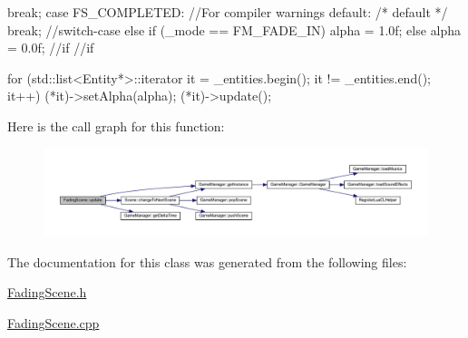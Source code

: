 \begin{DoxyCode}
{{{                                break;
                        case FS_COMPLETED:
                                //For compiler warnings
                        default:
                                /* default */
                                break;
                }//switch-case
        }
        else
        {
                if (_mode == FM_FADE_IN)
                {
                        alpha = 1.0f;
                } 
                else
                {
                        alpha = 0.0f;
                }//if
        }//if

        for (std::list<Entity*>::iterator it = _entities.begin(); it != 
      _entities.end(); it++)
        {
                (*it)->setAlpha(alpha);
                (*it)->update();
        }

}
\end{DoxyCode}


Here is the call graph for this function:
\nopagebreak
\begin{figure}[H]
\begin{center}
\leavevmode
\includegraphics[width=400pt]{d0/d30/class_fading_scene_a87df73975854a1170eef8b5fadd63b92_cgraph}
\end{center}
\end{figure}




The documentation for this class was generated from the following files:\begin{DoxyCompactItemize}
\item 
\hyperlink{_fading_scene_8h}{FadingScene.h}\item 
\hyperlink{_fading_scene_8cpp}{FadingScene.cpp}\end{DoxyCompactItemize}

